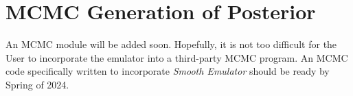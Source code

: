\documentclass[main.tex]{subfiles}
\begin{document}
\setcounter{section}{6}
\section{MCMC Generation of Posterior}\label{sec:mcmc}

An MCMC module will be added soon. Hopefully, it is not too difficult for the User to incorporate the emulator into a third-party MCMC program. An MCMC code specifically written to incorporate {\it Smooth Emulator} should be ready by Spring of 2024.
\end{document}
